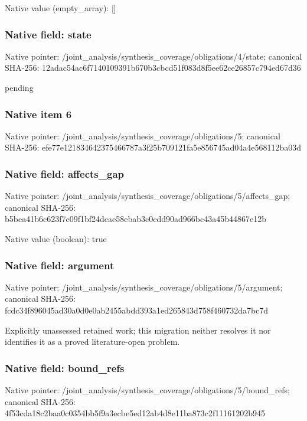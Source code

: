 \documentclass[10pt,a4paper]{article}
\begin{document}
Native value (empty\_\allowbreak{}array): []

\subsubsection{Native field: state}
Native pointer: /joint\_\allowbreak{}analysis/synthesis\_\allowbreak{}coverage/obligations/4/state; canonical SHA-256: 12adac54ac6f7140109391b670b3cbcd51f083d8f5ee62ce26857c794ed67d36

\begingroup\raggedright\sloppy pending\par\endgroup

\subsubsection{Native item 6}
Native pointer: /joint\_\allowbreak{}analysis/synthesis\_\allowbreak{}coverage/obligations/5; canonical SHA-256: efe77e121834642375466787a3f25b709121fa5e856745ad04a4e568112ba03d

\subsubsection{Native field: affects\_\allowbreak{}gap}
Native pointer: /joint\_\allowbreak{}analysis/synthesis\_\allowbreak{}coverage/obligations/5/affects\_\allowbreak{}gap; canonical SHA-256: b5bea41b6c623f7c09f1bf24dcae58ebab3c0cdd90ad966bc43a45b44867e12b

Native value (boolean): true

\subsubsection{Native field: argument}
Native pointer: /joint\_\allowbreak{}analysis/synthesis\_\allowbreak{}coverage/obligations/5/argument; canonical SHA-256: fcdc34f896045ad30a0d0e0ab2455abdd393a1ed265843d758f460732da7bc7d

\begingroup\raggedright\sloppy Explicitly unassessed retained work;\allowbreak{} this migration neither resolves it nor identifies it as a proved literature-open problem.\par\endgroup

\subsubsection{Native field: bound\_\allowbreak{}refs}
Native pointer: /joint\_\allowbreak{}analysis/synthesis\_\allowbreak{}coverage/obligations/5/bound\_\allowbreak{}refs; canonical SHA-256: 4f53cda18c2baa0c0354bb5f9a3ecbe5ed12ab4d8e11ba873c2f11161202b945
\end{document}
